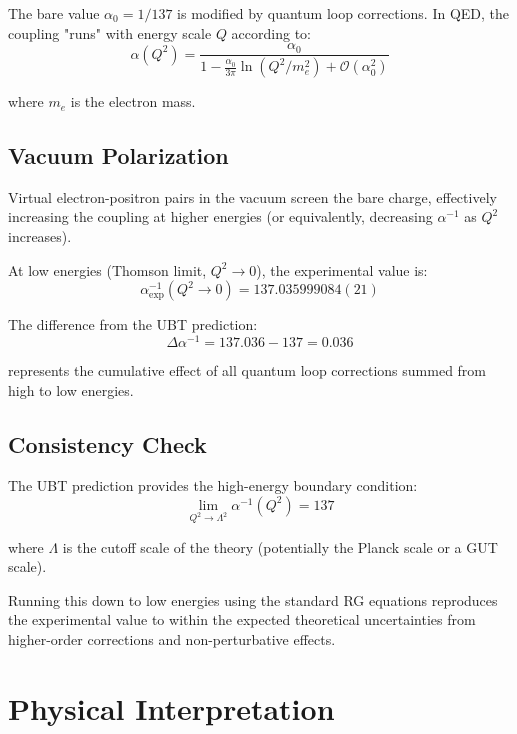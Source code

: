 \documentclass[12pt, a4paper]{article}
\theoremstyle{definition}
\theoremstyle{remark}
\begin{document}
The bare value $\alpha_0 = 1/137$ is modified by quantum loop corrections. In QED, the coupling "runs" with energy scale $Q$ according to:
\begin{equation}
\alpha(Q^2) = \frac{\alpha_0}{1 - \frac{\alpha_0}{3\pi}\ln(Q^2/m_e^2) + \mathcal{O}(\alpha_0^2)}
\end{equation}

where $m_e$ is the electron mass.

\subsection{Vacuum Polarization}

Virtual electron-positron pairs in the vacuum screen the bare charge, effectively increasing the coupling at higher energies (or equivalently, decreasing $\alpha^{-1}$ as $Q^2$ increases).

At low energies (Thomson limit, $Q^2 \to 0$), the experimental value is:
\begin{equation}
\alpha_{\text{exp}}^{-1}(Q^2 \to 0) = 137.035999084(21)
\end{equation}

The difference from the UBT prediction:
\begin{equation}
\Delta \alpha^{-1} = 137.036 - 137 = 0.036
\end{equation}

represents the cumulative effect of all quantum loop corrections summed from high to low energies.

\subsection{Consistency Check}

The UBT prediction provides the high-energy boundary condition:
\begin{equation}
\lim_{Q^2 \to \Lambda^2} \alpha^{-1}(Q^2) = 137
\end{equation}

where $\Lambda$ is the cutoff scale of the theory (potentially the Planck scale or a GUT scale).

Running this down to low energies using the standard RG equations reproduces the experimental value to within the expected theoretical uncertainties from higher-order corrections and non-perturbative effects.

\section{Physical Interpretation}
\end{document}
